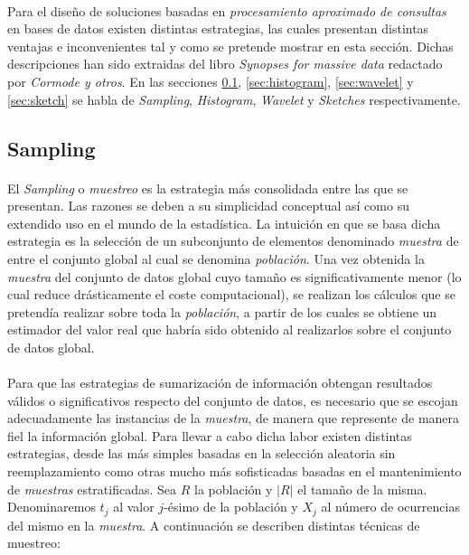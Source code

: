 \documentclass{subfiles}
\begin{document}
      \paragraph{}
      Para el diseño de soluciones basadas en \emph{procesamiento aproximado de consultas} en bases de datos existen distintas estrategias, las cuales presentan distintas ventajas e inconvenientes tal y como se pretende mostrar en esta sección. Dichas descripciones han sido extraidas del libro \emph{Synopses for massive data} \cite{cormode2012synopses} redactado por \emph{Cormode y otros}. En las secciones \ref{sec:sampling}, \ref{sec:histogram}, \ref{sec:wavelet} y \ref{sec:sketch} se habla de \emph{Sampling}, \emph{Histogram}, \emph{Wavelet} y \emph{Sketches} respectivamente.

      \subsection{Sampling}
      \label{sec:sampling}

        \paragraph{}
        El \emph{Sampling} o \emph{muestreo} es la estrategia más consolidada entre las que se presentan. Las razones se deben a su simplicidad conceptual así como su extendido uso en el mundo de la estadística. La intuición en que se basa dicha estrategia es la selección de un subconjunto de elementos denominado \emph{muestra} de entre el conjunto global al cual se denomina \emph{población}. Una vez obtenida la \emph{muestra} del conjunto de datos global cuyo tamaño es significativamente menor (lo cual reduce drásticamente el coste computacional), se realizan los cálculos que se pretendía realizar sobre toda la \emph{población}, a partir de los cuales se obtiene un estimador del valor real que habría sido obtenido al realizarlos sobre el conjunto de datos global.

        \paragraph{}
        Para que las estrategias de sumarización de información obtengan resultados válidos o significativos respecto del conjunto de datos, es necesario que se escojan adecuadamente las instancias de la \emph{muestra}, de manera que represente de manera fiel la información global. Para llevar a cabo dicha labor existen distintas estrategias, desde las más simples basadas en la selección aleatoria sin reemplazamiento como otras mucho más sofisticadas basadas en el mantenimiento de \emph{muestras} estratificadas. Sea $R$ la población y $|R|$ el tamaño de la misma. Denominaremos $t_j$ al valor $j$-ésimo de la población y $X_j$ al número de ocurrencias del mismo en la \emph{muestra}. A continuación se describen distintas técnicas de muestreo:
\end{document}
